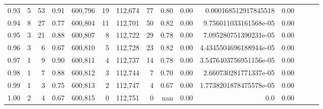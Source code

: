 \begin{tabular}{rrrrrrrrrrrrrrr}
0.93 &       5 &     53 &  0.91 &  600,796 &       19 &  112,674 &       77 &  0.80 &  0.00 &    0.000168512917845518 &      0.00 \\
0.94 &       8 &     27 &  0.77 &  600,804 &       11 &  112,701 &       50 &  0.82 &  0.00 &   9.756011033161568e-05 &      0.00 \\
0.95 &       3 &     21 &  0.88 &  600,807 &        8 &  112,722 &       29 &  0.78 &  0.00 &   7.095280751390231e-05 &      0.00 \\
0.96 &       3 &      6 &  0.67 &  600,810 &        5 &  112,728 &       23 &  0.82 &  0.00 &  4.4345504696188944e-05 &      0.00 \\
0.97 &       1 &      9 &  0.90 &  600,811 &        4 &  112,737 &       14 &  0.78 &  0.00 &  3.5476403756951156e-05 &      0.00 \\
0.98 &       1 &      7 &  0.88 &  600,812 &        3 &  112,744 &        7 &  0.70 &  0.00 &   2.660730281771337e-05 &      0.00 \\
0.99 &       1 &      3 &  0.75 &  600,813 &        2 &  112,747 &        4 &  0.67 &  0.00 &  1.7738201878475578e-05 &      0.00 \\
1.00 &       2 &      4 &  0.67 &  600,815 &        0 &  112,751 &        0 &   nan &  0.00 &                     0.0 &      0.00 \\
\bottomrule
\end{tabular}
